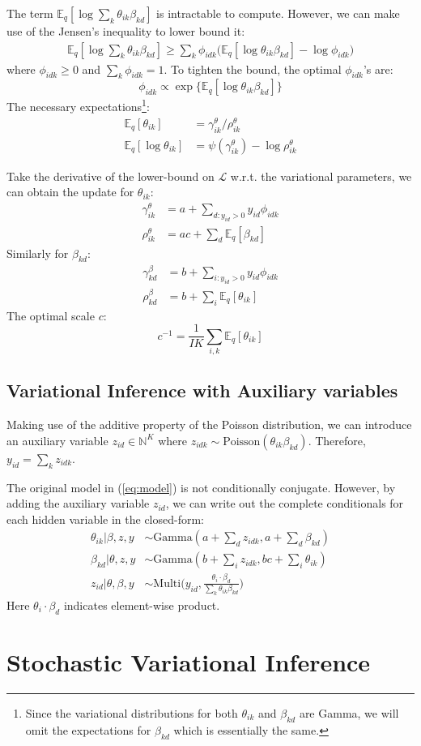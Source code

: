 \documentclass[10pt]{article} %
\begin{document}
The term $\mathbb{E}_q[\log\sum_k \theta_{ik} \beta_{kd}]$ is intractable to compute. However, we can make use of the Jensen's inequality to lower bound it:
\begin{align*}
\mathbb{E}_q[\log\sum_k \theta_{ik} \beta_{kd}] \geq \sum_{k} \phi_{idk} \big(\mathbb{E}_q[\log \theta_{ik} \beta_{kd}] - \log \phi_{idk}\big)
\end{align*}
where $\phi_{idk} \geq 0$ and $\sum_k \phi_{idk} = 1$. To tighten the bound, the optimal $\phi_{idk}$'s are:
\[
\phi_{idk} \propto \exp\{\mathbb{E}_q [\log \theta_{ik} \beta_{kd}]\}
\]
The necessary expectations\footnote{Since the variational distributions for both $\theta_{ik}$ and $\beta_{kd}$ are Gamma, we will omit the expectations for $\beta_{kd}$ which is essentially the same.}:
\begin{align*}
\mathbb{E}_q[\theta_{ik}] &= \gamma_{ik}^\theta / \rho_{ik}^\theta \\
\mathbb{E}_q[\log \theta_{ik}] &= \psi(\gamma_{ik}^\theta) - \log \rho_{ik}^\theta
\end{align*}

Take the derivative of the lower-bound on $\mathcal{L}$ w.r.t. the variational parameters, we can obtain the update for $\theta_{ik}$:
\begin{align*}
\gamma_{ik}^\theta &= a + \sum_{d: y_{id} > 0} y_{id} \phi_{idk}\\
\rho_{ik}^\theta &= ac + \sum_d \mathbb{E}_q[\beta_{kd}]
\end{align*}
Similarly for $\beta_{kd}$:
\begin{align*}
\gamma_{kd}^\beta &= b + \sum_{i: y_{id} > 0} y_{id} \phi_{idk}\\
\rho_{kd}^\beta &= b + \sum_i \mathbb{E}_q[\theta_{ik}]
\end{align*}
The optimal scale $c$:
\[
c^{-1} = \frac{1}{IK}\sum_{i, k} \mathbb{E}_q [\theta_{ik}]
\]

\subsection{Variational Inference with Auxiliary variables}

Making use of the additive property of the Poisson distribution, we can introduce an auxiliary variable $z_{id} \in \mathbb{N}^K$ where $z_{idk} \sim \text{Poisson}(\theta_{ik} \beta_{kd})$. Therefore, $y_{id} = \sum_k z_{idk}$. 

The original model in (\ref{eq:model}) is not conditionally conjugate. However, by adding the auxiliary variable $z_{id}$, we can write out the complete conditionals for each hidden variable in the closed-form:
\begin{align*}
\theta_{ik} | \beta, z, y &\sim \text{Gamma}(a + \sum_d z_{idk}, a + \sum_d \beta_{kd})\\
\beta_{kd} | \theta, z, y &\sim \text{Gamma}(b + \sum_i z_{idk}, bc + \sum_i \theta_{ik})\\
z_{id} | \theta, \beta, y &\sim \text{Multi}\Biggl(y_{id}, {\frac{\theta_i \cdot \beta_d}{\sum_k \theta_{ik} \beta_{kd}}}\Biggl)
\end{align*}
Here $\theta_i \cdot \beta_d$ indicates element-wise product. 

\section{Stochastic Variational Inference}
\end{document}
